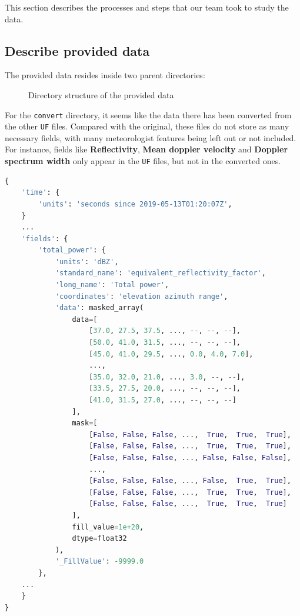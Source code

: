 This section describes the processes and steps that our team took to study the data.

\subsection{Describe provided data}

The provided data resides inside two parent directories:

\begin{figure}[H]
    \vspace{2em}
    \caption{Directory structure of the provided data}
\end{figure}


For the \texttt{convert} directory, it seems like the data there has been converted from the other \texttt{UF} files.
Compared with the original, these files do not store as many necessary fields,
with many meteorologist features being left out or not included.
For instance, fields like \textbf{Reflectivity}, \textbf{Mean doppler velocity} and \textbf{Doppler spectrum width} only appear
in the \texttt{UF} files, but not in the converted ones.

\begin{lstlisting}[language=python,caption={A sample of metadata extracted from UF file}]
{
    'time': {
        'units': 'seconds since 2019-05-13T01:20:07Z',
    }
    ...
    'fields': {
        'total_power': {
            'units': 'dBZ',
            'standard_name': 'equivalent_reflectivity_factor',
            'long_name': 'Total power',
            'coordinates': 'elevation azimuth range',
            'data': masked_array(
                data=[
                    [37.0, 27.5, 37.5, ..., --, --, --],
                    [50.0, 41.0, 31.5, ..., --, --, --],
                    [45.0, 41.0, 29.5, ..., 0.0, 4.0, 7.0],
                    ...,
                    [35.0, 32.0, 21.0, ..., 3.0, --, --],
                    [33.5, 27.5, 20.0, ..., --, --, --],
                    [41.0, 31.5, 27.0, ..., --, --, --]
                ],
                mask=[
                    [False, False, False, ...,  True,  True,  True],
                    [False, False, False, ...,  True,  True,  True],
                    [False, False, False, ..., False, False, False],
                    ...,
                    [False, False, False, ..., False,  True,  True],
                    [False, False, False, ...,  True,  True,  True],
                    [False, False, False, ...,  True,  True,  True]
                ],
                fill_value=1e+20,
                dtype=float32
            ),
            '_FillValue': -9999.0
        },
    ...
    }
}
\end{lstlisting}


